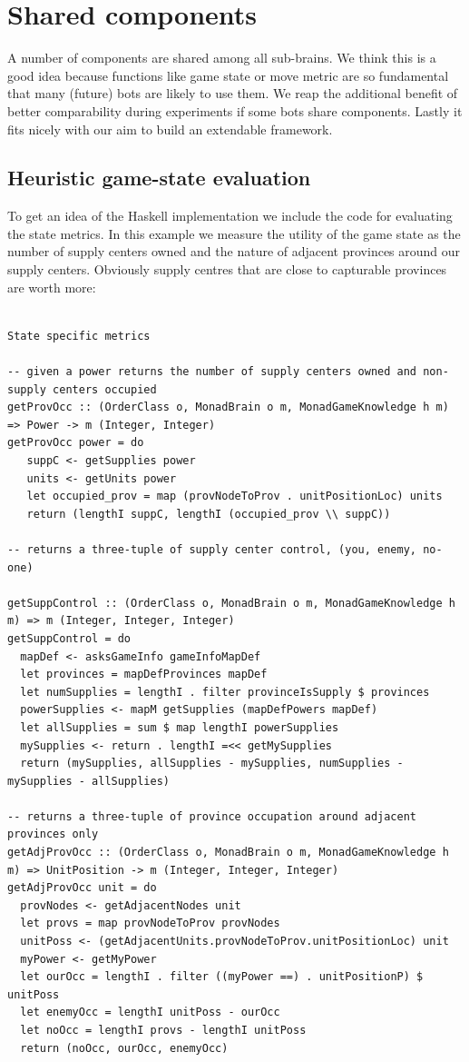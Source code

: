 \documentclass[pdftex,11pt,a4paper]{report}
\begin{document}
\section{Shared components}

A number of components are shared among all sub-brains. We think this is a 
good idea because functions like game state or move metric are so fundamental 
that many (future) bots are likely to use them. We reap the additional benefit of
better comparability during experiments if some bots share components. Lastly
it fits nicely with our aim to build an extendable framework.

\subsection{Heuristic game-state evaluation}

To get an idea of the Haskell implementation we include the code
for evaluating the state metrics. In this example we measure the
utility of the game state as the number of supply centers owned
and the nature of adjacent provinces around our supply centers. Obviously
supply centres that are close to capturable provinces are worth more:

\begin{verbatim}

State specific metrics

-- given a power returns the number of supply centers owned and non-supply centers occupied
getProvOcc :: (OrderClass o, MonadBrain o m, MonadGameKnowledge h m) => Power -> m (Integer, Integer)
getProvOcc power = do
   suppC <- getSupplies power
   units <- getUnits power
   let occupied_prov = map (provNodeToProv . unitPositionLoc) units
   return (lengthI suppC, lengthI (occupied_prov \\ suppC))

-- returns a three-tuple of supply center control, (you, enemy, no-one)

getSuppControl :: (OrderClass o, MonadBrain o m, MonadGameKnowledge h m) => m (Integer, Integer, Integer)
getSuppControl = do
  mapDef <- asksGameInfo gameInfoMapDef
  let provinces = mapDefProvinces mapDef
  let numSupplies = lengthI . filter provinceIsSupply $ provinces
  powerSupplies <- mapM getSupplies (mapDefPowers mapDef)
  let allSupplies = sum $ map lengthI powerSupplies
  mySupplies <- return . lengthI =<< getMySupplies
  return (mySupplies, allSupplies - mySupplies, numSupplies - mySupplies - allSupplies)

-- returns a three-tuple of province occupation around adjacent provinces only
getAdjProvOcc :: (OrderClass o, MonadBrain o m, MonadGameKnowledge h m) => UnitPosition -> m (Integer, Integer, Integer)
getAdjProvOcc unit = do
  provNodes <- getAdjacentNodes unit
  let provs = map provNodeToProv provNodes
  unitPoss <- (getAdjacentUnits.provNodeToProv.unitPositionLoc) unit
  myPower <- getMyPower
  let ourOcc = lengthI . filter ((myPower ==) . unitPositionP) $ unitPoss
  let enemyOcc = lengthI unitPoss - ourOcc
  let noOcc = lengthI provs - lengthI unitPoss
  return (noOcc, ourOcc, enemyOcc)

\end{verbatim}
\end{document}
